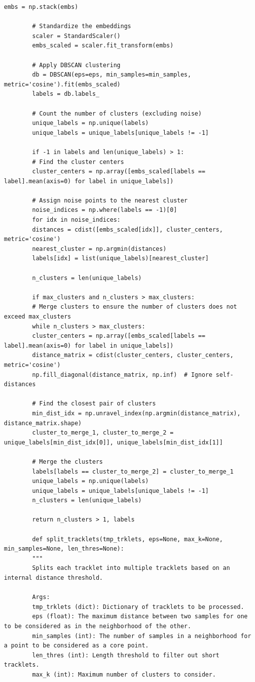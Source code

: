 \documentclass[12pt, a4paper, twoside]{article}
\begin{document}
\begin{lstlisting}[style=pythonstyle]
		embs = np.stack(embs)
		
		# Standardize the embeddings
		scaler = StandardScaler()
		embs_scaled = scaler.fit_transform(embs)
		
		# Apply DBSCAN clustering
		db = DBSCAN(eps=eps, min_samples=min_samples, metric='cosine').fit(embs_scaled)
		labels = db.labels_
		
		# Count the number of clusters (excluding noise)
		unique_labels = np.unique(labels)
		unique_labels = unique_labels[unique_labels != -1]
		
		if -1 in labels and len(unique_labels) > 1:
		# Find the cluster centers
		cluster_centers = np.array([embs_scaled[labels == label].mean(axis=0) for label in unique_labels])
		
		# Assign noise points to the nearest cluster
		noise_indices = np.where(labels == -1)[0]
		for idx in noise_indices:
		distances = cdist([embs_scaled[idx]], cluster_centers, metric='cosine')
		nearest_cluster = np.argmin(distances)
		labels[idx] = list(unique_labels)[nearest_cluster]
		
		n_clusters = len(unique_labels)
		
		if max_clusters and n_clusters > max_clusters:
		# Merge clusters to ensure the number of clusters does not exceed max_clusters
		while n_clusters > max_clusters:
		cluster_centers = np.array([embs_scaled[labels == label].mean(axis=0) for label in unique_labels])
		distance_matrix = cdist(cluster_centers, cluster_centers, metric='cosine')
		np.fill_diagonal(distance_matrix, np.inf)  # Ignore self-distances
		
		# Find the closest pair of clusters
		min_dist_idx = np.unravel_index(np.argmin(distance_matrix), distance_matrix.shape)
		cluster_to_merge_1, cluster_to_merge_2 = unique_labels[min_dist_idx[0]], unique_labels[min_dist_idx[1]]
		
		# Merge the clusters
		labels[labels == cluster_to_merge_2] = cluster_to_merge_1
		unique_labels = np.unique(labels)
		unique_labels = unique_labels[unique_labels != -1]
		n_clusters = len(unique_labels)
		
		return n_clusters > 1, labels
		
		def split_tracklets(tmp_trklets, eps=None, max_k=None, min_samples=None, len_thres=None):
		"""
		Splits each tracklet into multiple tracklets based on an internal distance threshold.
		
		Args:
		tmp_trklets (dict): Dictionary of tracklets to be processed.
		eps (float): The maximum distance between two samples for one to be considered as in the neighborhood of the other.
		min_samples (int): The number of samples in a neighborhood for a point to be considered as a core point.
		len_thres (int): Length threshold to filter out short tracklets.
		max_k (int): Maximum number of clusters to consider.
		

\end{lstlisting}
\end{document}
